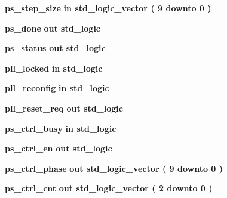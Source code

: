 \begin{DoxyCompactItemize}
{\bf ps\+\_\+step\+\_\+size}  {\bfseries {\bfseries \textcolor{keywordflow}{in}\textcolor{vhdlchar}{ }}} {\bfseries \textcolor{comment}{std\+\_\+logic\+\_\+vector}\textcolor{vhdlchar}{ }\textcolor{vhdlchar}{(}\textcolor{vhdlchar}{ }\textcolor{vhdlchar}{ } \textcolor{vhdldigit}{9} \textcolor{vhdlchar}{ }\textcolor{keywordflow}{downto}\textcolor{vhdlchar}{ }\textcolor{vhdlchar}{ } \textcolor{vhdldigit}{0} \textcolor{vhdlchar}{ }\textcolor{vhdlchar}{)}\textcolor{vhdlchar}{ }} 
\item 
{\bf ps\+\_\+done}  {\bfseries {\bfseries \textcolor{keywordflow}{out}\textcolor{vhdlchar}{ }}} {\bfseries \textcolor{comment}{std\+\_\+logic}\textcolor{vhdlchar}{ }} 
\item 
{\bf ps\+\_\+status}  {\bfseries {\bfseries \textcolor{keywordflow}{out}\textcolor{vhdlchar}{ }}} {\bfseries \textcolor{comment}{std\+\_\+logic}\textcolor{vhdlchar}{ }} 
\item 
{\bf pll\+\_\+locked}  {\bfseries {\bfseries \textcolor{keywordflow}{in}\textcolor{vhdlchar}{ }}} {\bfseries \textcolor{comment}{std\+\_\+logic}\textcolor{vhdlchar}{ }} 
\item 
{\bf pll\+\_\+reconfig}  {\bfseries {\bfseries \textcolor{keywordflow}{in}\textcolor{vhdlchar}{ }}} {\bfseries \textcolor{comment}{std\+\_\+logic}\textcolor{vhdlchar}{ }} 
\item 
{\bf pll\+\_\+reset\+\_\+req}  {\bfseries {\bfseries \textcolor{keywordflow}{out}\textcolor{vhdlchar}{ }}} {\bfseries \textcolor{comment}{std\+\_\+logic}\textcolor{vhdlchar}{ }} 
\item 
{\bf ps\+\_\+ctrl\+\_\+busy}  {\bfseries {\bfseries \textcolor{keywordflow}{in}\textcolor{vhdlchar}{ }}} {\bfseries \textcolor{comment}{std\+\_\+logic}\textcolor{vhdlchar}{ }} 
\item 
{\bf ps\+\_\+ctrl\+\_\+en}  {\bfseries {\bfseries \textcolor{keywordflow}{out}\textcolor{vhdlchar}{ }}} {\bfseries \textcolor{comment}{std\+\_\+logic}\textcolor{vhdlchar}{ }} 
\item 
{\bf ps\+\_\+ctrl\+\_\+phase}  {\bfseries {\bfseries \textcolor{keywordflow}{out}\textcolor{vhdlchar}{ }}} {\bfseries \textcolor{comment}{std\+\_\+logic\+\_\+vector}\textcolor{vhdlchar}{ }\textcolor{vhdlchar}{(}\textcolor{vhdlchar}{ }\textcolor{vhdlchar}{ } \textcolor{vhdldigit}{9} \textcolor{vhdlchar}{ }\textcolor{keywordflow}{downto}\textcolor{vhdlchar}{ }\textcolor{vhdlchar}{ } \textcolor{vhdldigit}{0} \textcolor{vhdlchar}{ }\textcolor{vhdlchar}{)}\textcolor{vhdlchar}{ }} 
\item 
{\bf ps\+\_\+ctrl\+\_\+cnt}  {\bfseries {\bfseries \textcolor{keywordflow}{out}\textcolor{vhdlchar}{ }}} {\bfseries \textcolor{comment}{std\+\_\+logic\+\_\+vector}\textcolor{vhdlchar}{ }\textcolor{vhdlchar}{(}\textcolor{vhdlchar}{ }\textcolor{vhdlchar}{ } \textcolor{vhdldigit}{2} \textcolor{vhdlchar}{ }\textcolor{keywordflow}{downto}\textcolor{vhdlchar}{ }\textcolor{vhdlchar}{ } \textcolor{vhdldigit}{0} \textcolor{vhdlchar}{ }\textcolor{vhdlchar}{)}\textcolor{vhdlchar}{ }} 

\end{DoxyCompactItemize}
